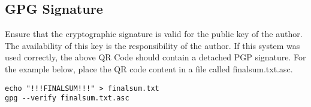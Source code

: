 \documentclass[a4paper,12pt]{texMemo}
\begin{document}
\subsection{GPG Signature}
Ensure that the cryptographic signature is valid for the public key of the author. The availability of this key is the responsibility of the author. If this system was used correctly, the above QR Code should contain a detached PGP signature. For the example below, place the QR code content in a file called finalsum.txt.asc.
\begin{lstlisting}
echo "!!!FINALSUM!!!" > finalsum.txt
gpg --verify finalsum.txt.asc
\end{lstlisting}
\end{document}
